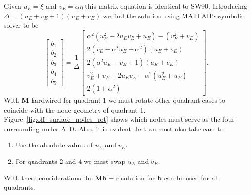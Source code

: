 \documentclass[12pt,letterpaper,margin=0.5in]{article}
\begin{document}
Given $u_E = \xi$ and $v_E = \alpha \eta$ this matrix equation is identical to SW90. 
Introducing $\Delta = \left (u_E + v_E + 1 \right)\left (u_E + v_E\right)$ we find
the solution using MATLAB's symbolic solver to be
\begin{equation}
\left[ {\begin{array}{*{20}{c}}
{{b_1}}\\
{{b_2}}\\
{{b_3}}\\
{{b_4}}\\
{{b_5}}
\end{array}} \right] = \frac{1}{\Delta }\left[ {\begin{array}{*{20}{c}}
{\alpha^2(u_E^2 + 2{u_E}{v_E} + {u_E}) - (v_E^2 + {v_E})}\\[4pt]
{2\left( {{v_E} - \alpha^2{u_E} + \alpha^2} \right)\left( {{u_E} + {v_E}} \right)}\\[4pt]
{2\left( {\alpha^2{u_E} - {v_E} + 1} \right)\left( {{u_E} + {v_E}} \right)}\\[4pt]
{v_E^2 + {v_E} + 2{u_E}{v_E} - \alpha^2(u_E^2 + {u_E})}\\[4pt]
2(1+\alpha^2)
\end{array}} \right].
\label{eq:new}
\end{equation}
With $\mathbf{M}$ hardwired for quadrant 1 we must rotate other quadrant cases to coincide with the
node geometry of quadrant 1.  Figure~\ref{fig:off_surface_nodes_rot} shows which nodes must serve as
the four surrounding nodes A--D.  Also, it is evident that we must also take care to
\begin{enumerate}
	\item Use the absolute values of $u_E$ and $v_E$.
	\item For quadrants 2 and 4 we must swap $u_E$ and $v_E$.
\end{enumerate}
With these considerations the $\mathbf{Mb = r}$ solution for $\mathbf{b}$ can be used for all quadrants.
\end{document}
